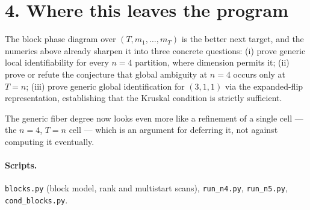 \documentclass[11pt]{article}
\theoremstyle{remark}
\begin{document}
\section*{4. Where this leaves the program}

The block phase diagram over $(T,m_1,\dots,m_T)$ is the better next target, and the numerics above already sharpen it into three concrete questions: (i) prove generic local identifiability for every $n=4$ partition, where dimension permits it; (ii) prove or refute the conjecture that global ambiguity at $n=4$ occurs only at $T=n$; (iii) prove generic global identification for $(3,1,1)$ via the expanded-flip representation, establishing that the Kruskal condition is strictly sufficient.

The generic fiber degree now looks even more like a refinement of a single cell --- the $n=4$, $T=n$ cell --- which is an argument for deferring it, not against computing it eventually.

\paragraph{Scripts.} \texttt{blocks.py} (block model, rank and multistart scans), \texttt{run\_n4.py}, \texttt{run\_n5.py}, \texttt{cond\_blocks.py}.
\end{document}
